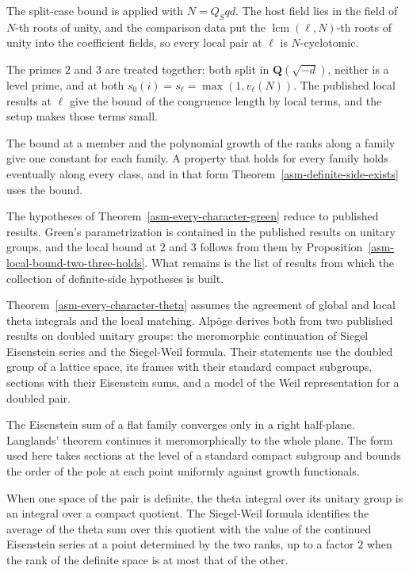 The split-case bound is applied with $N=Q_Sqd$. The host field lies in the
field of $N$-th roots of unity, and the comparison data put the
$\operatorname{lcm}(\ell,N)$-th roots of unity into the coefficient fields, so
every local pair at $\ell$ is $N$-cyclotomic.

The primes $2$ and $3$ are treated together: both split in
$\mathbf Q(\sqrt{-d})$, neither is a level prime, and at both
$s_0(i)=s_\ell=\max(1,v_\ell(N))$. The published local results at $\ell$ give
the bound of the congruence length by local terms, and the setup makes those
terms small.

The bound at a member and the polynomial growth of the ranks along a family
give one constant for each family. A property that holds for every family holds
eventually along every class, and in that form
Theorem~\ref{asm-definite-side-exists} uses the bound.

The hypotheses of Theorem~\ref{asm-every-character-green} reduce to published
results. Green's parametrization is contained in the published results on
unitary groups, and the local bound at $2$ and $3$ follows from them by
Proposition~\ref{asm-local-bound-two-three-holds}. What remains is the
list of results from which the collection of definite-side hypotheses is
built.

Theorem~\ref{asm-every-character-theta} assumes the agreement of global and
local theta integrals and the local matching. Alpöge derives both from two
published results on doubled unitary groups: the meromorphic continuation of
Siegel Eisenstein series and the Siegel-Weil formula. Their statements use
the doubled group of a lattice space, its frames with their standard compact
subgroups, sections with their Eisenstein sums, and a model of the Weil
representation for a doubled pair.

The Eisenstein sum of a flat family converges only in a right half-plane.
Langlands' theorem continues it meromorphically to the whole plane. The form
used here takes sections at the level of a standard compact subgroup and
bounds the order of the pole at each point uniformly against growth
functionals.

When one space of the pair is definite, the theta integral over its unitary
group is an integral over a compact quotient. The Siegel-Weil formula
identifies the average of the theta sum over this quotient with the value
of the continued Eisenstein series at a point determined by the two ranks,
up to a factor $2$ when the rank of the definite space is at most that of
the other.

